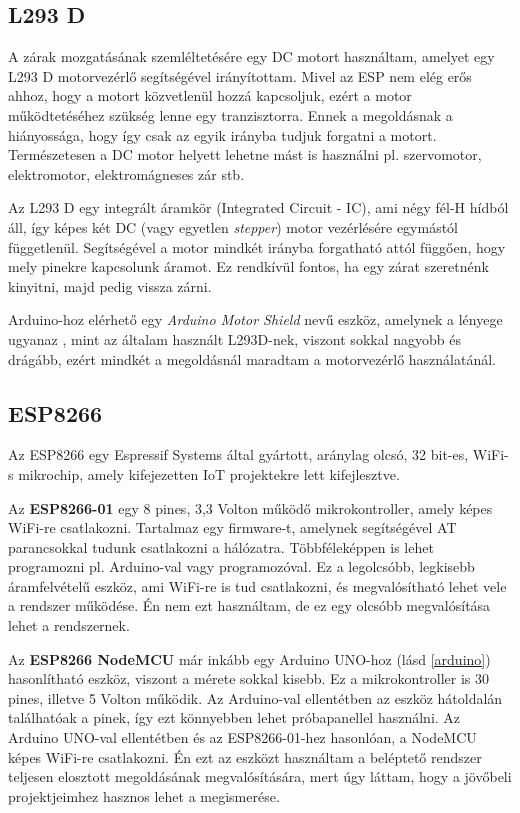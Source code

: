 \documentclass[
]{thesis-ekf}
\theoremstyle{definition}
\theoremstyle{remark}
\begin{document}
\subsection{L293 D} \label{l293d}
A zárak mozgatásának szemléltetésére egy DC motort használtam, amelyet egy L293 D motorvezérlő segítségével irányítottam. Mivel az ESP nem elég erős ahhoz, hogy a motort közvetlenül hozzá kapcsoljuk, ezért a motor működtetéséhez szükség lenne egy tranzisztorra. Ennek a megoldásnak a hiányossága, hogy így csak az egyik irányba tudjuk forgatni a motort. Természetesen a DC motor helyett lehetne mást is használni pl. szervomotor, elektromotor, elektromágneses zár stb.

Az L293 D egy integrált áramkör (Integrated Circuit - IC), ami négy fél-H hídból áll, így képes két DC (vagy egyetlen \emph{stepper}) motor vezérlésére egymástól függetlenül. Segítségével a motor mindkét irányba forgatható attól függően, hogy mely pinekre kapcsolunk áramot. \cite{l293d} Ez rendkívül fontos, ha egy zárat szeretnénk kinyitni, majd pedig vissza zárni.

Arduino-hoz elérhető egy \emph{Arduino Motor Shield} nevű eszköz, amelynek a lényege ugyanaz \cite{arduino-motor-shield}, mint az általam használt L293D-nek, viszont sokkal nagyobb és drágább, ezért mindkét a megoldásnál maradtam a motorvezérlő használatánál.

\subsection{ESP8266}
Az ESP8266 egy Espressif Systems által gyártott, aránylag olcsó, 32 bit-es, WiFi-s mikrochip, amely kifejezetten IoT projektekre lett kifejlesztve. \cite{espressif-esp8266}

Az \textbf{ESP8266-01} egy 8 pines, 3,3 Volton működő mikrokontroller, amely képes WiFi-re csatlakozni. Tartalmaz egy firmware-t, amelynek segítségével AT parancsokkal tudunk csatlakozni a hálózatra.
Többféleképpen is lehet programozni pl. Arduino-val vagy programozóval. Ez a legolcsóbb, legkisebb áramfelvételű eszköz, ami WiFi-re is tud csatlakozni, és megvalósítható lehet vele a rendszer működése. Én nem ezt használtam, de ez egy olcsóbb megvalósítása lehet a rendszernek.

Az \textbf{ESP8266 NodeMCU} már inkább egy Arduino UNO-hoz (lásd \ref{arduino}) hasonlítható eszköz, viszont a mérete sokkal kisebb. Ez a mikrokontroller is 30 pines, illetve 5 Volton működik. Az Arduino-val ellentétben az eszköz hátoldalán találhatóak a pinek, így ezt könnyebben lehet próbapanellel használni. Az Arduino UNO-val ellentétben és az ESP8266-01-hez hasonlóan, a NodeMCU képes WiFi-re csatlakozni. Én ezt az eszközt használtam a beléptető rendszer teljesen elosztott megoldásának megvalósítására, mert úgy láttam, hogy a jövőbeli projektjeimhez hasznos lehet a megismerése.
\end{document}
